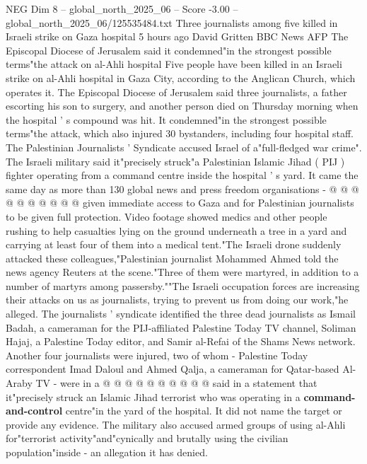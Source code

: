 \begin{textsample}{NEG Dim 8 – global\_north\_2025\_06 – Score -3.00 – global\_north\_2025\_06/125535484.txt}  \label{ex:f8_neg_021}
Three journalists among five killed in Israeli strike on Gaza hospital 5 hours ago David Gritten BBC News AFP The Episcopal Diocese of Jerusalem said it condemned"in the strongest possible terms"the attack on al-Ahli hospital Five people have been killed in an Israeli strike on al-Ahli hospital in Gaza City, according to the Anglican Church, which operates it.
The Episcopal Diocese of Jerusalem said three journalists, a father escorting his son to surgery, and another person died on Thursday morning when the hospital ' s compound was hit.
It condemned"in the strongest possible terms"the attack, which also injured 30 bystanders, including four hospital staff.
The Palestinian Journalists ' Syndicate accused Israel of a"full-fledged war crime".
The Israeli military said it"precisely struck"a Palestinian Islamic Jihad ( PIJ ) fighter operating from a command centre inside the hospital ' s yard.
It came the same day as more than 130 global news and press freedom organisations - @ @ @ @ @ @ @ @ @ @ given immediate access to Gaza and for Palestinian journalists to be given full protection.
Video footage showed medics and other people rushing to help casualties lying on the ground underneath a tree in a yard and carrying at least four of them into a medical tent."The Israeli drone suddenly attacked these colleagues,"Palestinian journalist Mohammed Ahmed told the news agency Reuters at the scene."Three of them were martyred, in addition to a number of martyrs among passersby.""The Israeli occupation forces are increasing their attacks on us as journalists, trying to prevent us from doing our work,"he alleged.
The journalists ' syndicate identified the three dead journalists as Ismail Badah, a cameraman for the PIJ-affiliated Palestine Today TV channel, Soliman Hajaj, a Palestine Today editor, and Samir al-Refai of the Shams News network.
Another four journalists were injured, two of whom - Palestine Today correspondent Imad Daloul and Ahmed Qalja, a cameraman for Qatar-based Al-Araby TV - were in a @ @ @ @ @ @ @ @ @ @ said in a statement that it"precisely struck an Islamic Jihad terrorist who was operating in a \textbf{command-and-control} centre"in the yard of the hospital.
It did not name the target or provide any evidence.
The military also accused armed groups of using al-Ahli for"terrorist activity"and"cynically and brutally using the civilian population"inside - an allegation it has denied.

\end{textsample}
